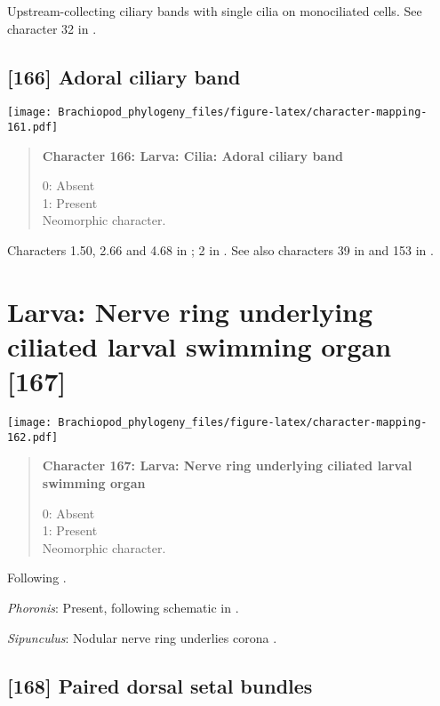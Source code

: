\documentclass[openany]{book}
\theoremstyle{definition}
\theoremstyle{definition}
\theoremstyle{definition}
\theoremstyle{remark}
\begin{document}
Upstream-collecting ciliary bands with single cilia on monociliated
cells. See character 32 in \citet{Glenner2004}.

\subsection*{{[}166{]} Adoral ciliary band}\label{adoral-ciliary-band}

\texttt{[image: Brachiopod\_phylogeny\_files/figure-latex/character-mapping-161.pdf]}

\begin{quote}
\textbf{Character 166: Larva: Cilia: Adoral ciliary band}

0: Absent\\
1: Present\\
Neomorphic character.
\end{quote}

Characters 1.50, 2.66 and 4.68 in \citet{SPS1996}; 2 in
\citet{Vinther2008}. See also characters 39 in \citet{Haszprunar1996}
and 153 in \citet{Giribet2002}.

\section{Larva: Nerve ring underlying ciliated larval swimming organ
{[}167{]}}\label{larva-nerve-ring-underlying-ciliated-larval-swimming-organ-167}

\texttt{[image: Brachiopod\_phylogeny\_files/figure-latex/character-mapping-162.pdf]}

\begin{quote}
\textbf{Character 167: Larva: Nerve ring underlying ciliated larval
swimming organ}

0: Absent\\
1: Present\\
Neomorphic character.
\end{quote}

Following \citet{Wanninger2009}.

\hypertarget{Phoronis-coding-167}{}
\emph{Phoronis}: Present, following schematic in \citet{Gruhl2016}.

\hypertarget{Sipunculus-coding-167}{}
\emph{Sipunculus}: Nodular nerve ring underlies corona \citep{Reed1982}.

\subsection*{{[}168{]} Paired dorsal setal
bundles}\label{paired-dorsal-setal-bundles}
\end{document}
